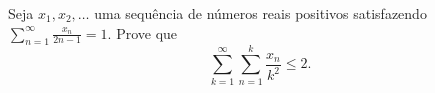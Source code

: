 Seja \(x_1, x_2, \ldots\) uma sequência de números reais positivos satisfazendo \(\sum_{n=1}^{\infty}\frac{x_n}{2n-1}=1\). Prove que 
\[ \sum_{k=1}^{\infty} \sum_{n=1}^{k} \frac{x_n}{k^2} \le 2. \]
